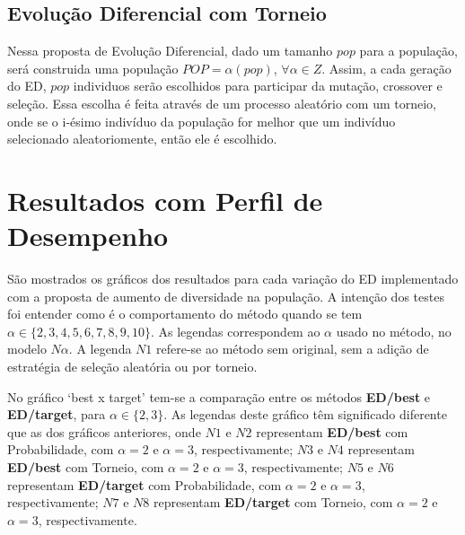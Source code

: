 \documentclass[12pt]{article}
\begin{document}
\subsection*{Evolução Diferencial com Torneio}
Nessa proposta de Evolução Diferencial, dado um tamanho $pop$ para a população, será construida uma população $POP = \alpha (pop)$, $\forall \alpha \in Z$. Assim, a cada geração do ED, $pop$  individuos serão escolhidos para participar da mutação, crossover e seleção. Essa escolha é feita através de um processo aleatório com um torneio, onde se o i-ésimo indivíduo da população for melhor que um indivíduo selecionado aleatoriomente, então ele é escolhido.
\section*{Resultados com Perfil de Desempenho}
São mostrados os gráficos dos resultados para cada variação do ED implementado com a proposta de aumento de diversidade na população. A intenção dos testes foi entender como é o comportamento do método quando se tem $\alpha \in \{2,3,4,5,6,7,8,9,10\}$. As legendas correspondem ao $\alpha$ usado no método, no modelo $N\alpha$. 
A legenda $N1$ refere-se ao método sem original, sem a adição de estratégia de seleção aleatória ou por torneio.

No gráfico `best x target' tem-se a comparação entre os métodos \textbf{ED/best} e \textbf{ED/target}, para $\alpha \in \{2,3\}$. As legendas deste gráfico têm significado diferente que as dos gráficos anteriores, onde $N1$ e $N2$ representam \textbf{ED/best} com Probabilidade, com $\alpha=2$ e $\alpha = 3$, respectivamente; $N3$ e $N4$ representam \textbf{ED/best} com Torneio, com $\alpha=2$ e $\alpha = 3$, respectivamente; $N5$ e $N6$ representam \textbf{ED/target} com Probabilidade, com $\alpha=2$ e $\alpha = 3$, respectivamente; $N7$ e $N8$ representam \textbf{ED/target} com Torneio, com $\alpha=2$ e $\alpha = 3$, respectivamente. 
\end{document}
